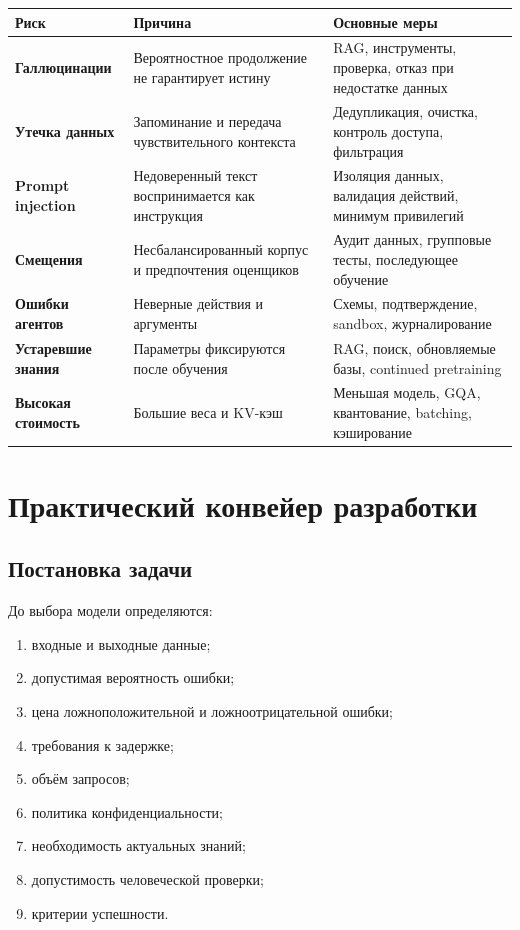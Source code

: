 \documentclass[12pt,a4paper]{article}
\newcommand{\1}{\mathbf{1}}
\theoremstyle{definition}
\theoremstyle{remark}
\begin{document}
\begin{center}
\begin{tabularx}{\textwidth}{>{\bfseries}l X X}
\toprule
Риск & Причина & Основные меры \\
\midrule
Галлюцинации
& Вероятностное продолжение не гарантирует истину
& RAG, инструменты, проверка, отказ при недостатке данных
\\
Утечка данных
& Запоминание и передача чувствительного контекста
& Дедупликация, очистка, контроль доступа, фильтрация
\\
Prompt injection
& Недоверенный текст воспринимается как инструкция
& Изоляция данных, валидация действий, минимум привилегий
\\
Смещения
& Несбалансированный корпус и предпочтения оценщиков
& Аудит данных, групповые тесты, последующее обучение
\\
Ошибки агентов
& Неверные действия и аргументы
& Схемы, подтверждение, sandbox, журналирование
\\
Устаревшие знания
& Параметры фиксируются после обучения
& RAG, поиск, обновляемые базы, continued pretraining
\\
Высокая стоимость
& Большие веса и KV-кэш
& Меньшая модель, GQA, квантование, batching, кэширование
\\
\bottomrule
\end{tabularx}
\end{center}

\section{Практический конвейер разработки}

\subsection{Постановка задачи}

До выбора модели определяются:

\begin{enumerate}
    \item входные и выходные данные;
    \item допустимая вероятность ошибки;
    \item цена ложноположительной и ложноотрицательной ошибки;
    \item требования к задержке;
    \item объём запросов;
    \item политика конфиденциальности;
    \item необходимость актуальных знаний;
    \item допустимость человеческой проверки;
    \item критерии успешности.
\end{enumerate}
\end{document}
